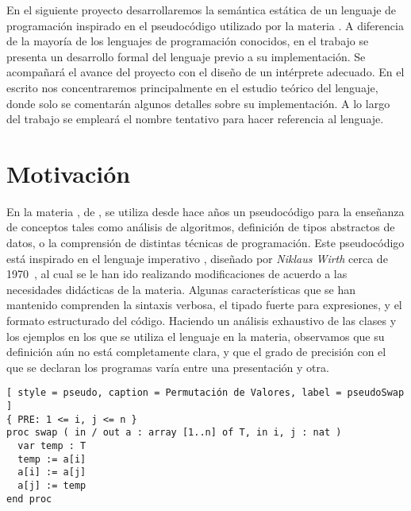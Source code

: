 
En el siguiente proyecto desarrollaremos la semántica estática de un lenguaje de programación inspirado en el pseudocódigo utilizado por la materia \Materia{}.
A diferencia de la mayoría de los lenguajes de programación conocidos, en el trabajo se presenta un desarrollo formal del lenguaje previo a su implementación.
Se acompañará el avance del proyecto con el diseño de un intérprete adecuado.
En el escrito nos concentraremos principalmente en el estudio teórico del lenguaje, donde solo se comentarán algunos detalles sobre su implementación.
A lo largo del trabajo se empleará el nombre tentativo \Lenguaje{} para hacer referencia al lenguaje.

\section{Motivación}

En la materia \Materia{}, de \Facultad{}, se utiliza desde hace años un pseudocódigo para la enseñanza de conceptos tales como análisis de algoritmos, definición de tipos abstractos de datos, o la comprensión de distintas técnicas de programación.
Este pseudocódigo está inspirado en el lenguaje imperativo \Pascal{}, diseñado por \textit{Niklaus Wirth} cerca de 1970~\cite{Pascal}, al cual se le han ido realizando modificaciones de acuerdo a las necesidades didácticas de la materia.
Algunas características que se han mantenido comprenden la sintaxis verbosa, el tipado fuerte para expresiones, y el formato estructurado del código.
Haciendo un análisis exhaustivo de las clases y los ejemplos en los que se utiliza el lenguaje en la materia, observamos que su definición aún no está completamente clara, y que el grado de precisión con el que se declaran los programas varía entre una presentación y otra.

\begin{lstlisting}[ style = pseudo, caption = Permutación de Valores, label = pseudoSwap ]
{ PRE: 1 <= i, j <= n }
proc swap ( in / out a : array [1..n] of T, in i, j : nat )
  var temp : T
  temp := a[i]
  a[i] := a[j]
  a[j] := temp
end proc
\end{lstlisting}

